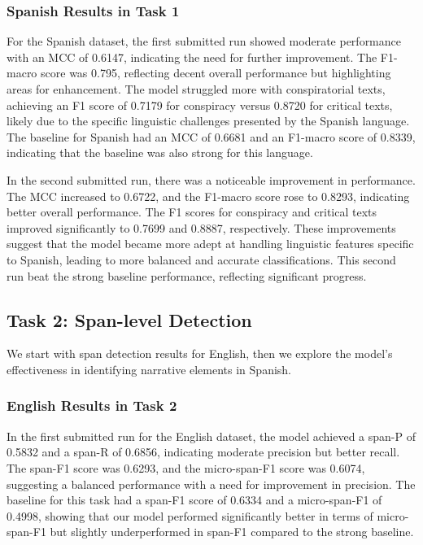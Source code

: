 \documentclass{Configuration_Files/PoliMi3i_thesis}
\begin{document}
\subsubsection{Spanish Results in Task 1} \label{subsubsec:es_res_T1}
For the Spanish dataset, the first submitted run showed moderate performance with an MCC of 0.6147, indicating the need for further improvement. The F1-macro score was 0.795, reflecting decent overall performance but highlighting areas for enhancement. The model struggled more with conspiratorial texts, achieving an F1 score of 0.7179 for conspiracy versus 0.8720 for critical texts, likely due to the specific linguistic challenges presented by the Spanish language. The baseline for Spanish had an MCC of 0.6681 and an F1-macro score of 0.8339, indicating that the baseline was also strong for this language.

In the second submitted run, there was a noticeable improvement in performance. The MCC increased to 0.6722, and the F1-macro score rose to 0.8293, indicating better overall performance. The F1 scores for conspiracy and critical texts improved significantly to 0.7699 and 0.8887, respectively. These improvements suggest that the model became more adept at handling linguistic features specific to Spanish, leading to more balanced and accurate classifications. This second run beat the strong baseline performance, reflecting significant progress.

\subsection{Task 2: Span-level Detection} \label{subsec:subtask2_discussion}
We start with span detection results for English, then we explore the model's effectiveness in identifying narrative elements in Spanish.

\subsubsection{English Results in Task 2} \label{subsubsec:en_res_T2}
In the first submitted run for the English dataset, the model achieved a span-P of 0.5832 and a span-R of 0.6856, indicating moderate precision but better recall. The span-F1 score was 0.6293, and the micro-span-F1 score was 0.6074, suggesting a balanced performance with a need for improvement in precision. The baseline for this task had a span-F1 score of 0.6334 and a micro-span-F1 of 0.4998, showing that our model performed significantly better in terms of micro-span-F1 but slightly underperformed in span-F1 compared to the strong baseline.
\end{document}
